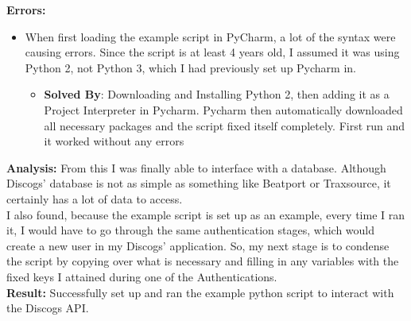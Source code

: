 \documentclass{article}
\begin{document}
\textbf{Errors:}
\begin{itemize}
    \item When first loading the example script in PyCharm, a lot of the syntax were causing errors. Since the script is at least 4 years old, I assumed it was using Python 2, not Python 3, which I had previously set up Pycharm in.
    \begin{itemize}
        \item \textbf{Solved By}: Downloading and Installing Python 2, then adding it as a Project Interpreter in Pycharm. Pycharm then automatically downloaded all necessary packages and the script fixed itself completely. First run and it worked without any errors
    \end{itemize}
\end{itemize}
\textbf{Analysis:} From this I was finally able to interface with a database. Although Discogs' database is not as simple as something like Beatport or Traxsource, it certainly has a lot of data to access.\\
I also found, because the example script is set up as an example, every time I ran it, I would have to go through the same authentication stages, which would create a new user in my Discogs' application. So, my next stage is to condense the script by copying over what is necessary and filling in any variables with the fixed keys I attained during one of the Authentications.\\
\textbf{Result:} Successfully set up and ran the example python script to interact with the Discogs API.
\end{document}

